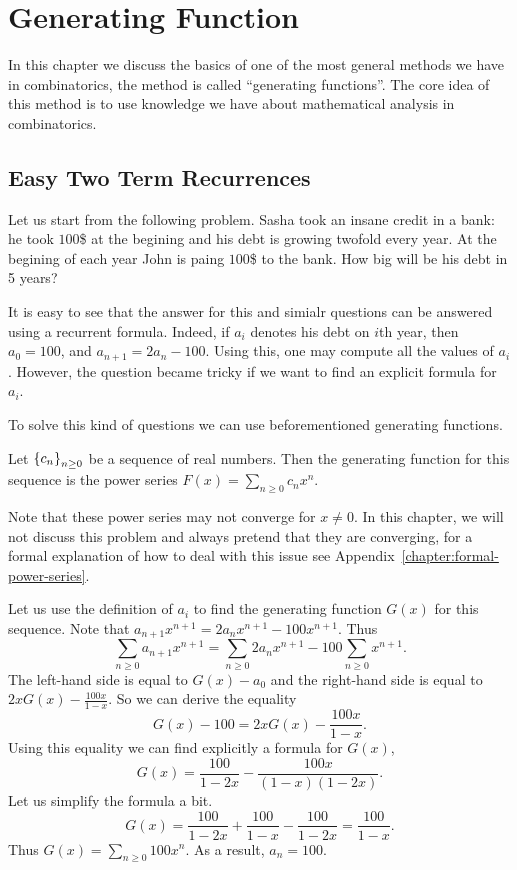 \chapter{Generating Function}
In this chapter we discuss the basics of one of the most general methods we have
in combinatorics, the method is called ``generating functions''. The core idea
of this method is to use knowledge we have about mathematical analysis in
combinatorics.

\section{Easy Two Term Recurrences}
Let us start from the following problem.
Sasha took an insane credit in a bank: he took $100$\$ at the begining and
his debt is growing twofold every year. At the begining of each year John is
paing $100$\$ to the bank. How big will be his debt in 5 years?

It is easy to see that the answer for this and simialr questions can be answered
using a recurrent formula. Indeed, if $a_i$ denotes his debt on $i$th year,
then $a_0 = 100$, and $a_{n + 1} = 2 a_n - 100$. Using this, one may compute
all the values of $a_i$. However, the question became tricky if we want to
find an explicit formula for $a_i$.

To solve this kind of questions we can use beforementioned generating functions.
\begin{definition}
  Let $\set{c_n}_{n \ge 0}$ be a sequence of real numbers. Then
  the generating function for this sequence is the power series
  $F(x) = \sum_{n \ge 0} c_n x^n$.
\end{definition}
Note that these power series may not converge for $x \neq 0$.
In this chapter, we will not discuss this problem and always pretend that
they are converging, for a formal explanation of how to deal with this issue see
Appendix~\ref{chapter:formal-power-series}.

Let us use the definition of $a_i$ to find the generating function $G(x)$
for this sequence. Note that
$a_{n + 1} x^{n + 1} = 2 a_n x^{n + 1} - 100 x^{n + 1}$. Thus
\[
  \sum_{n \ge 0} a_{n + 1} x^{n + 1} =
    \sum_{n \ge 0} 2 a_n x^{n + 1} - 100 \sum_{n \ge 0} x^{n + 1}.
\]
The left-hand side is equal to $G(x) - a_0$ and the right-hand side is
equal to $2xG(x) - \frac{100 x}{1 - x}$. So we can derive the equality
\[
  G(x) - 100 = 2xG(x) - \frac{100 x}{1 - x}.
\]
Using this equality we can find explicitly a formula for $G(x)$,
\[
  G(x) = \frac{100}{1 - 2x} - \frac{100x}{(1 - x)(1 - 2x)}.
\]
Let us simplify the formula a bit.
\[
  G(x) = \frac{100}{1 - 2x} + \frac{100}{1 - x} - \frac{100}{1 - 2x} =
  \frac{100}{1 - x}.
\]
Thus $G(x) = \sum_{n \ge 0} 100 x^n$. As a result, $a_n = 100$.

